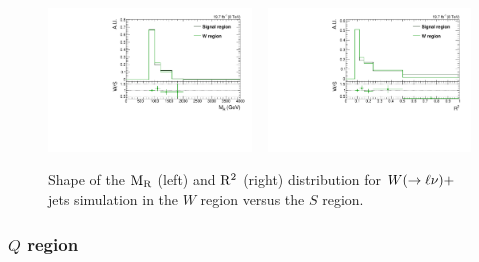 % 
% 
% 
% 
\begin{figure}[htbp]
\centering
\includegraphics[width=0.48\textwidth]{figures/razor_selection/shapeplots/MR_comparison_WJ_SIG}
~
\includegraphics[width=0.48\textwidth]{figures/razor_selection/shapeplots/R2_comparison_WJ_SIG}
\caption{Shape of the $\mathrm{M_R}$ (left) and $\mathrm{R^2}$ (right) distribution for $W(\rightarrow
\ell\nu)+$jets simulation in the $W$ region versus the $S$ region. 
\label{fig:boost_W_region_shape}}
\end{figure}


\subsubsection{\texorpdfstring{$Q$}{Q} region}

